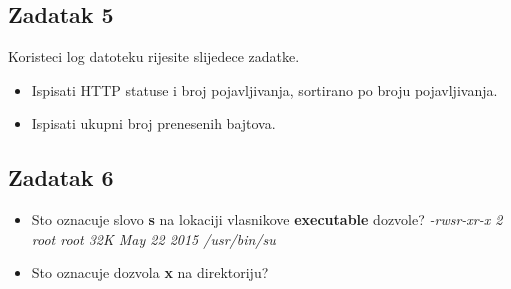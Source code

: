 	\subsection*{Zadatak 5}
  Koristeci log datoteku rijesite slijedece zadatke.
	\begin{itemize}
    \item Ispisati HTTP statuse i broj pojavljivanja, sortirano po broju pojavljivanja.
    \item Ispisati ukupni broj prenesenih bajtova.
	\end{itemize}

  \subsection*{Zadatak 6}
	\begin{itemize}
    \item Sto oznacuje slovo \textbf{s} na lokaciji vlasnikove \textbf{executable} dozvole? \textit{-rwsr-xr-x 2 root root 32K May 22  2015 /usr/bin/su}
    \item Sto oznacuje dozvola \textbf{x} na direktoriju?
	\end{itemize}